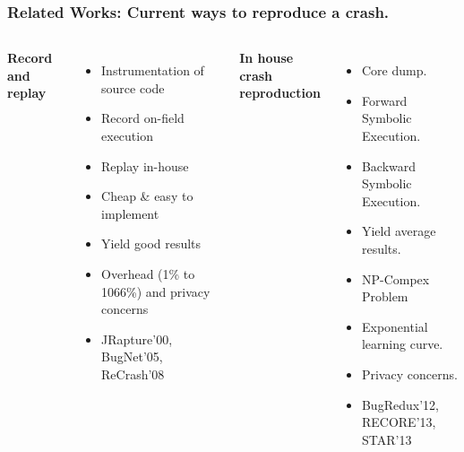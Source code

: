 \documentclass{beamer}
\begin{document}
\begin{frame}
\frametitle{Related Works: Current ways to reproduce a crash.}
\begin{columns}[c] %

\textbf{Record and replay}
\begin{itemize}
\item Instrumentation of source code
\item Record on-field execution
\item Replay in-house
\vspace{0.3cm}
\item Cheap \& easy to implement
\item Yield good results
\item Overhead (1\% to 1066\%) and privacy concerns
\vspace{0.3cm}
\item JRapture'00, BugNet'05, ReCrash'08
\end{itemize}



\textbf{In house crash reproduction}
\begin{itemize}
\item Core dump.
\item Forward Symbolic Execution.
\item Backward Symbolic Execution.
\vspace{0.3cm}
\item Yield average results.
\item NP-Compex Problem
\item Exponential learning curve.
\item Privacy concerns.
\vspace{0.3cm}
\item BugRedux'12, RECORE'13, STAR'13
\end{itemize}

\end{columns}
\end{frame}


\end{document}
